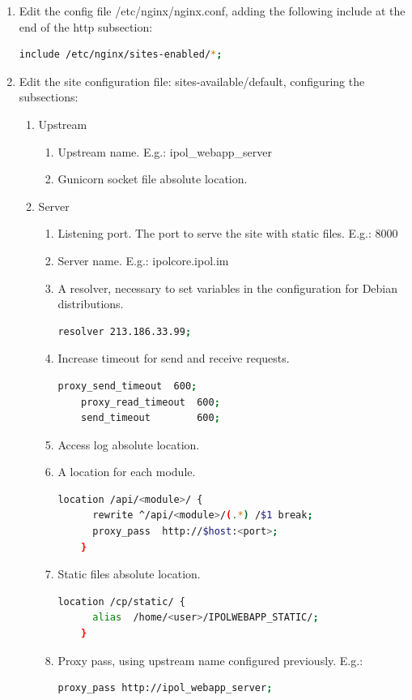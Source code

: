 \documentclass[a4paper,12pt]{article}
\begin{document}
\begin{enumerate}
    \item Edit the config file /etc/nginx/nginx.conf, adding the following include at the end of the http subsection:
    \begin{lstlisting}[language=Bash]
    include /etc/nginx/sites-enabled/*;
    \end{lstlisting}
    \item Edit the site configuration file: sites-available/default, configuring the subsections:
    \begin{enumerate}
    \item Upstream
    \begin{enumerate}
    \item Upstream name. E.g.: ipol\_webapp\_server
    \item Gunicorn socket file absolute location.
    \end{enumerate}
    \item Server
    \begin{enumerate}
    \item Listening port. The port to serve the site with static files. E.g.: 8000
    \item Server name. E.g.: ipolcore.ipol.im
    \item A resolver, necessary to set variables in the configuration for Debian distributions.
    \begin{lstlisting}[language=Bash]
    resolver 213.186.33.99;
    \end{lstlisting}
    \item Increase timeout for send and receive requests.
    \begin{lstlisting}[language=Bash]
    proxy_send_timeout	600;
    proxy_read_timeout	600;
    send_timeout		600;
    \end{lstlisting}
    \item Access log absolute location.
    \item A location for each module.
    \begin{lstlisting}[language=Bash]
    location /api/<module>/ {
      rewrite ^/api/<module>/(.*) /$1 break;
      proxy_pass  http://$host:<port>;
    }
    \end{lstlisting}
    \item Static files absolute location.
    \begin{lstlisting}[language=Bash]
    location /cp/static/ {
      alias  /home/<user>/IPOLWEBAPP_STATIC/;
    }
    \end{lstlisting}
    \item Proxy pass, using upstream name configured previously.
    E.g.:
    \begin{lstlisting}[language=Bash]
    proxy_pass http://ipol_webapp_server;
    \end{lstlisting}

    \end{enumerate}
    \end{enumerate}
\end{enumerate}
\end{document}
